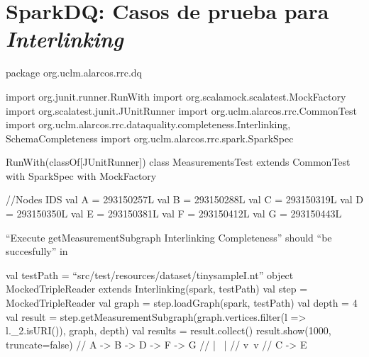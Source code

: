 \chapter{SparkDQ: Casos de prueba para \textit{Interlinking}}
\label{chap:sparkrdf.test.inter}
\begin{listing}[
  language = scala,
  numbers=left,
  numberstyle=\tiny,
  stepnumber=5,
  numbersep=5pt,
  frame=single,
  caption  = {SparkDQ: Fragmento de tests unitarios para Interlinking},
  label    = code:sparkdq.test.inter]
package org.uclm.alarcos.rrc.dq

import org.junit.runner.RunWith
import org.scalamock.scalatest.MockFactory
import org.scalatest.junit.JUnitRunner
import org.uclm.alarcos.rrc.CommonTest
import org.uclm.alarcos.rrc.dataquality.completeness.{Interlinking,
  SchemaCompleteness}
import org.uclm.alarcos.rrc.spark.SparkSpec

RunWith(classOf[JUnitRunner])
class MeasurementsTest extends CommonTest with SparkSpec with MockFactory {
  //Nodes IDS
  val A = 293150257L
  val B = 293150288L
  val C = 293150319L
  val D = 293150350L
  val E = 293150381L
  val F = 293150412L
  val G = 293150443L

  ``Execute getMeasurementSubgraph Interlinking Completeness'' should ``be
  succesfully'' in {
    val testPath = ``src/test/resources/dataset/tinysampleI.nt''
    object MockedTripleReader extends Interlinking(spark, testPath)
    val step = MockedTripleReader
    val graph = step.loadGraph(spark, testPath)
    val depth = 4
    val result = step.getMeasurementSubgraph(graph.vertices.filter(l =>
    l._2.isURI()), graph, depth)
    val results = result.collect()
    result.show(1000, truncate=false)
    //    A -> B -> D -> F -> G
    //         | \  |
    //         v  \,v
    //         C -> E

}}
\end{listing}
